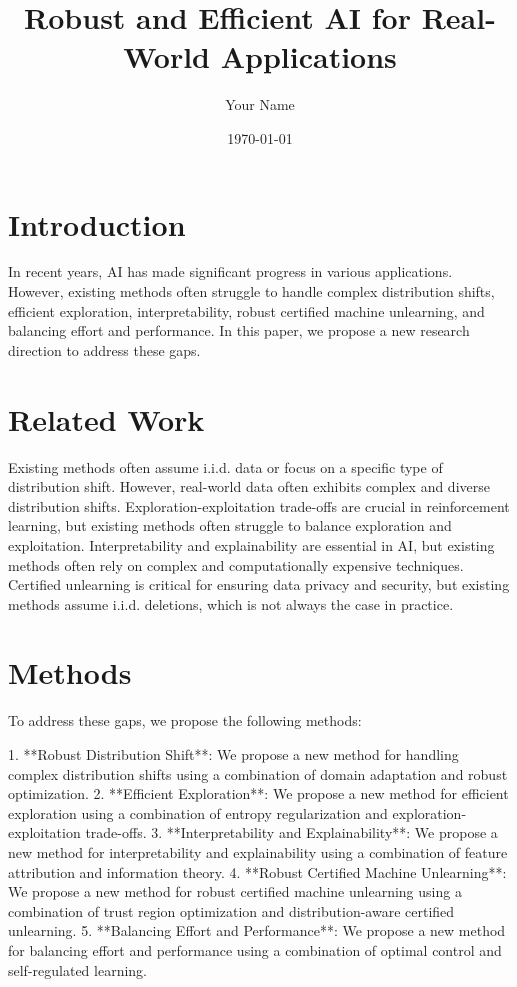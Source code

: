\documentclass{article}
\begin{document}
\title{Robust and Efficient AI for Real-World Applications}

\author{Your Name}

\date{\today}

\maketitle

\section{Introduction}

In recent years, AI has made significant progress in various applications. However, existing methods often struggle to handle complex distribution shifts, efficient exploration, interpretability, robust certified machine unlearning, and balancing effort and performance. In this paper, we propose a new research direction to address these gaps.

\section{Related Work}

Existing methods often assume i.i.d. data or focus on a specific type of distribution shift. However, real-world data often exhibits complex and diverse distribution shifts. Exploration-exploitation trade-offs are crucial in reinforcement learning, but existing methods often struggle to balance exploration and exploitation. Interpretability and explainability are essential in AI, but existing methods often rely on complex and computationally expensive techniques. Certified unlearning is critical for ensuring data privacy and security, but existing methods assume i.i.d. deletions, which is not always the case in practice.

\section{Methods}

To address these gaps, we propose the following methods:

1.  **Robust Distribution Shift**: We propose a new method for handling complex distribution shifts using a combination of domain adaptation and robust optimization.
2.  **Efficient Exploration**: We propose a new method for efficient exploration using a combination of entropy regularization and exploration-exploitation trade-offs.
3.  **Interpretability and Explainability**: We propose a new method for interpretability and explainability using a combination of feature attribution and information theory.
4.  **Robust Certified Machine Unlearning**: We propose a new method for robust certified machine unlearning using a combination of trust region optimization and distribution-aware certified unlearning.
5.  **Balancing Effort and Performance**: We propose a new method for balancing effort and performance using a combination of optimal control and self-regulated learning.
\end{document}
